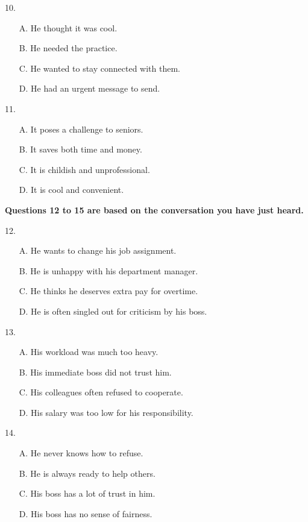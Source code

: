 \documentclass[UTF8,11pt]{ctexart}
\begin{document}
10.


\begin{itemize}[leftmargin=2em,itemsep=.2em,topsep=.4em]\item[A.] He thought it was cool.
\item[B.] He needed the practice.
\item[C.] He wanted to stay connected with them.
\item[D.] He had an urgent message to send.
\end{itemize}

11.


\begin{itemize}[leftmargin=2em,itemsep=.2em,topsep=.4em]\item[A.] It poses a challenge to seniors.
\item[B.] It saves both time and money.
\item[C.] It is childish and unprofessional.
\item[D.] It is cool and convenient.
\end{itemize}

\textbf{Questions 12 to 15 are based on the conversation you have just heard.}


12.


\begin{itemize}[leftmargin=2em,itemsep=.2em,topsep=.4em]\item[A.] He wants to change his job assignment.
\item[B.] He is unhappy with his department manager.
\item[C.] He thinks he deserves extra pay for overtime.
\item[D.] He is often singled out for criticism by his boss.
\end{itemize}

13.


\begin{itemize}[leftmargin=2em,itemsep=.2em,topsep=.4em]\item[A.] His workload was much too heavy.
\item[B.] His immediate boss did not trust him.
\item[C.] His colleagues often refused to cooperate.
\item[D.] His salary was too low for his responsibility.
\end{itemize}

14.


\begin{itemize}[leftmargin=2em,itemsep=.2em,topsep=.4em]\item[A.] He never knows how to refuse.
\item[B.] He is always ready to help others.
\item[C.] His boss has a lot of trust in him.
\item[D.] His boss has no sense of fairness.
\end{itemize}
\end{document}

